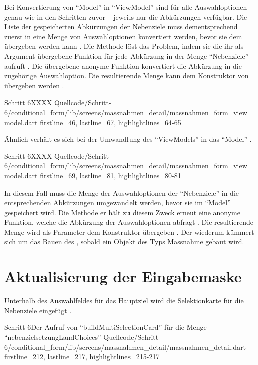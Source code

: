 Bei Konvertierung von \enquote{Model} in \enquote{ViewModel} sind für alle Auswahloptionen -- genau wie in den Schritten zuvor -- jeweils nur die Abkürzungen verfügbar.
Die Liste der gespeicherten Abkürzungen der Nebenziele muss dementsprechend zuerst in eine Menge von Auswahloptionen konvertiert werden,
bevor sie dem  übergeben werden kann \Lst{\ref{lst:Schritt6setModel}}.
Die Methode  löst das Problem,
indem sie die ihr als Argument übergebene Funktion für jede Abkürzung in der Menge \enquote{Nebenziele} aufruft .
Die übergebene anonyme Funktion konvertiert die Abkürzung in die zugehörige Auswahloption.
Die resultierende Menge kann dem Konstruktor von  übergeben werden .

\begin{alexlisting}{Schritt 6}{XXXX}
  {Quellcode/Schritt-6/conditional_form/lib/screens/massnahmen_detail/massnahmen_form_view_model.dart}
  {firstline=46, lastline=67, highlightlines={64-65}}
  \label{lst:Schritt6setModel}
\end{alexlisting}


Ähnlich verhält es sich bei der Umwandlung des \enquote{ViewModels} in das \enquote{Model} \Lst{\ref{lst:Schritt6nebenzieleSetBuilder}}.

\begin{alexlisting}{Schritt 6}{XXXX}
  {Quellcode/Schritt-6/conditional_form/lib/screens/massnahmen_detail/massnahmen_form_view_model.dart}
  {firstline=69, lastline=81, highlightlines={80-81}}
  \label{lst:Schritt6nebenzieleSetBuilder}
\end{alexlisting}

In diesem Fall muss die Menge der Auswahloptionen der \enquote{Nebenziele} in die entsprechenden Abkürzungen umgewandelt werden,
bevor sie im \enquote{Model} gespeichert wird.
Die Methode  er hält zu diesem Zweck erneut eine anonyme Funktion,
welche die Abkürzung der Auswahloptionen abfragt .
Die resultierende Menge wird als Parameter dem Konstruktor  übergeben .
Der  wiederum kümmert sich um das Bauen des , sobald ein Objekt des Typs Massnahme gebaut wird.



\section{Aktualisierung der Eingabemaske}

Unterhalb des Auswahlfeldes für das Hauptziel wird die Selektionkarte für die Nebenziele eingefügt \Lst{\ref{lst:Schritt6buildMultiSelectionCardnebenzielsetzungLandChoices}}.
\begin{alexlisting}{Schritt 6}{Der Aufruf von \enquote{buildMultiSelectionCard} für die Menge \enquote{nebenzielsetzungLandChoices}}
  {Quellcode/Schritt-6/conditional_form/lib/screens/massnahmen_detail/massnahmen_detail.dart}
  {firstline=212, lastline=217, highlightlines={215-217}}
  \label{lst:Schritt6buildMultiSelectionCardnebenzielsetzungLandChoices}
\end{alexlisting}

